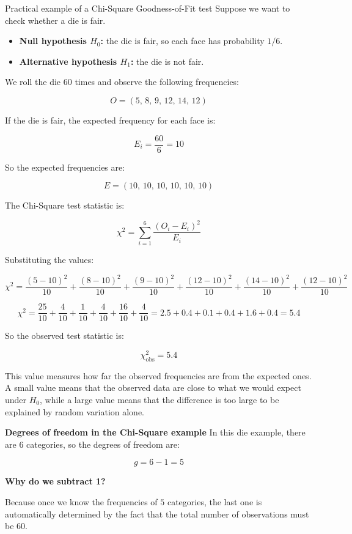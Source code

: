 \begin{example}{Practical example of a Chi-Square Goodness-of-Fit test}
Suppose we want to check whether a die is fair.

\begin{itemize}
    \item \textbf{Null hypothesis \(H_0\):} the die is fair, so each face has probability \(1/6\).
    \item \textbf{Alternative hypothesis \(H_1\):} the die is not fair.
\end{itemize}

We roll the die \(60\) times and observe the following frequencies:

\[
O = (5,\,8,\,9,\,12,\,14,\,12)
\]

If the die is fair, the expected frequency for each face is:

\[
E_i=\frac{60}{6}=10
\]

So the expected frequencies are:

\[
E = (10,\,10,\,10,\,10,\,10,\,10)
\]

The Chi-Square test statistic is:

\[
\chi^2 = \sum_{i=1}^{6}\frac{(O_i-E_i)^2}{E_i}
\]

Substituting the values:

\[
\chi^2 =
\frac{(5-10)^2}{10}+
\frac{(8-10)^2}{10}+
\frac{(9-10)^2}{10}+
\frac{(12-10)^2}{10}+
\frac{(14-10)^2}{10}+
\frac{(12-10)^2}{10}
\]

\[
\chi^2 =
\frac{25}{10}+\frac{4}{10}+\frac{1}{10}+\frac{4}{10}+\frac{16}{10}+\frac{4}{10}
= 2.5+0.4+0.1+0.4+1.6+0.4 = 5.4
\]

So the observed test statistic is:

\[
\chi^2_{\text{obs}}=5.4
\]

This value measures how far the observed frequencies are from the expected ones. A small value means that the observed data are close to what we would expect under \(H_0\), while a large value means that the difference is too large to be explained by random variation alone.

\vs


\textbf{Degrees of freedom in the Chi-Square example}
In this die example, there are \(6\) categories, so the degrees of freedom are:

\[
g = 6-1 = 5
\]

\textbf{Why do we subtract 1?}

Because once we know the frequencies of \(5\) categories, the last one is automatically determined by the fact that the total number of observations must be \(60\).


\end{example}
